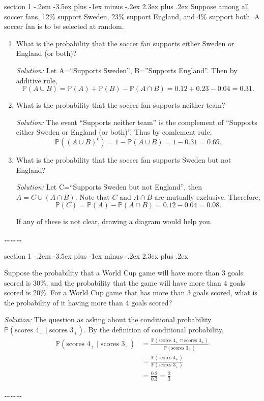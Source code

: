 \documentclass[11pt]{article}
\makeatletter
\newcommand{\pr}{\mathbb{P}}
\newenvironment{problem}{\@startsection
       {section}
       {1}
       {-.2em}
       {-3.5ex plus -1ex minus -.2ex}
       {2.3ex plus .2ex}
       {\pagebreak[3]%
       \large\bf\noindent{Problem }
       }
       }
       {%
       \begin{center}\large\bf \ldots\ldots\ldots\end{center}}
\makeatother
\begin{document}
\begin{problem}{}
Suppose among all soccer fans, 12\% support  Sweden, 23\% support  England, and 4\% support both. A soccer fan is to be selected at random.
\begin{enumerate}

\item What is the probability that the soccer fan supports either  Sweden or  England (or both)?

\vspace{0.2cm}
\textit{Solution:} 
Let A=``Supports Sweden'', B=''Supports England''. Then by additive rule,
$$\pr(A \cup B)=\pr(A)+\pr(B)-\pr(A\cap B) = 0.12+0.23 - 0.04 =0.31. $$

\item What is the probability that the soccer fan supports neither team?

\vspace{0.2cm}
\textit{Solution:} 
The event ``Supports neither team'' is the complement of ``Supports either Sweden or England (or both)''. Thus by comlement rule,
    $$\pr((A \cup B)^c)=1-\pr(A\cup B) = 1-0.31=0.69.$$

\item What is the probability that the soccer fan supports  Sweden but not  England?
    
\vspace{0.2cm}
\textit{Solution:} 
Let C=``Supports Sweden but not England'', then $A = C \cup (A\cap B)$. Note that $C$ and $A\cap B$ are mutually exclusive. Therefore,
$$\pr(C) =\pr(A) -  \pr(A\cap B)= 0.12-0.04=0.08.$$

If any of these is not clear, drawing a diagram would help you.
\end{enumerate}
\end{problem}

\begin{problem}{}

Suppose the probability that a World Cup game will have more than 3 goals scored is 30\%, and the probability that the game will have more than 4 goals scored is 20\%.
For a World Cup game that has more than 3 goals scored, what is the
probability of it having more than 4 goals scored? 

\vspace{0.2cm}
\textit{Solution:} 
The question as asking about the conditional probability $\pr(\text{scores } 4_{+} \mid \text{scores } 3_+) $. By the definition of conditional probability,
\begin{align*}
    \pr(\text{scores } 4_{+} \mid \text{scores } 3_+) 
    &= \frac{\pr(\text{scores } 4_{+} \cap \text{scores } 3_{+})}{\pr(\text{scores } 3_+)} \\
    &=  \frac{\pr(\text{scores } 4_{+} )}{\pr(\text{scores } 3_+)} \\
    &= \frac{0.2}{0.3}=\frac{2}{3}
\end{align*}
\end{problem}
\end{document}
